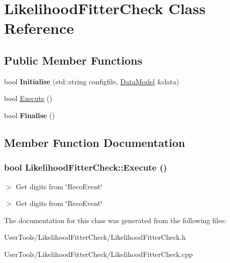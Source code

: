 \hypertarget{classLikelihoodFitterCheck}{
\section{LikelihoodFitterCheck Class Reference}
\label{classLikelihoodFitterCheck}
}
\subsection*{Public Member Functions}
\begin{DoxyCompactItemize}
\item 
\hypertarget{classLikelihoodFitterCheck_a796e1357c908ddb2d16dd06d11daf199}{
bool {\bfseries Initialise} (std::string configfile, \hyperlink{classDataModel}{DataModel} \&data)}
\label{classLikelihoodFitterCheck_a796e1357c908ddb2d16dd06d11daf199}

\item 
bool \hyperlink{classLikelihoodFitterCheck_a7df99c1fac639db633877aeadde27ca7}{Execute} ()
\item 
\hypertarget{classLikelihoodFitterCheck_a4c454e19b497d56f47cd0d34632d5174}{
bool {\bfseries Finalise} ()}
\label{classLikelihoodFitterCheck_a4c454e19b497d56f47cd0d34632d5174}

\end{DoxyCompactItemize}


\subsection{Member Function Documentation}
\hypertarget{classLikelihoodFitterCheck_a7df99c1fac639db633877aeadde27ca7}{
\subsubsection[{Execute}]{\setlength{\rightskip}{0pt plus 5cm}bool LikelihoodFitterCheck::Execute ()}}
\label{classLikelihoodFitterCheck_a7df99c1fac639db633877aeadde27ca7}


$>$ Get digits from \char`\"{}RecoEvent\char`\"{}

$>$ Get digits from \char`\"{}RecoEvent\char`\"{} 

The documentation for this class was generated from the following files:\begin{DoxyCompactItemize}
\item 
UserTools/LikelihoodFitterCheck/LikelihoodFitterCheck.h\item 
UserTools/LikelihoodFitterCheck/LikelihoodFitterCheck.cpp\end{DoxyCompactItemize}
